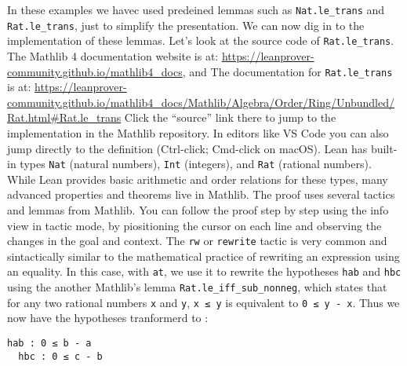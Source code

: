 In these examples we havec used predeined lemmas such as 
\lstinline[language=lean]|Nat.le_trans| and
\lstinline[language=lean]|Rat.le_trans|, just to simplify the presentation.
We can now dig in to the implementation of these lemmas.
Let’s look at the source code of \lstinline[language=lean]|Rat.le_trans|.
The Mathlib 4 documentation website is at:
\url{https://leanprover-community.github.io/mathlib4_docs}, and
The documentation for 
\lstinline[language=lean]|Rat.le_trans| is at:
\url{https://leanprover-community.github.io/mathlib4_docs/Mathlib/Algebra/Order/Ring/Unbundled/Rat.html#Rat.le_trans}
Click the “source” link there to jump to the implementation in the Mathlib repository. In editors like 
VS Code you can also jump directly to the definition (Ctrl-click; Cmd-click on macOS).
Lean has built-in types \texttt{Nat} (natural numbers), \texttt{Int} (integers), 
and \texttt{Rat} (rational numbers). While Lean provides basic arithmetic and 
order relations for these types, many advanced properties and theorems live in Mathlib.
The proof uses several tactics and lemmas from Mathlib. You can follow 
the proof step by step using the info view in tactic mode, by piositioning the cursor
on each line and observing the changes in the goal and context.
The \lstinline[language=lean]|rw| or \lstinline[language=lean]|rewrite| tactic  
is very common and sintactically similar to
the mathematical practice of rewriting an expression using an equality.
In this case, with \lstinline[language=lean]|at|, we use it to rewrite the 
hypotheses \lstinline[language=lean]|hab| 
and \lstinline[language=lean]|hbc|
using the another Mathlib's lemma \lstinline[language=lean]|Rat.le_iff_sub_nonneg|, 
which states that for any two rational numbers \lstinline[language=lean]|x| and
\lstinline[language=lean]|y|, \lstinline[language=lean]|x ≤ y| 
is equivalent to \lstinline[language=lean]|0 ≤ y - x|.
Thus we now have the hypotheses tranformerd to :  
\begin{lstlisting}[language=lean]
  hab : 0 ≤ b - a
  hbc : 0 ≤ c - b
\end{lstlisting}
